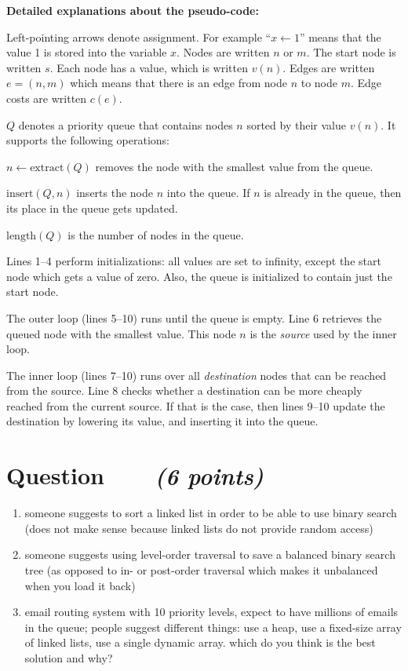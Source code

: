 \documentclass[a4paper]{article}
\newcounter{question}
\newcommand{\question}[1]{\refstepcounter{question}\section*{Question~\thequestion~~~\small\emph{(#1)}}}
\renewcommand*\thequestion{\arabic{question}}
\begin{document}
\vfill

\noindent\textbf{Detailed explanations about the pseudo-code:}

Left-pointing arrows denote assignment.
For example ``$x \leftarrow 1$'' means that the value 1 is stored into the variable $x$.
Nodes are written $n$ or $m$.
The start node is written $s$.
Each node has a value, which is written $v(n)$.
Edges are written $e=(n,m)$ which means that there is an edge from node $n$ to node $m$.
Edge costs are written $c(e)$.

$Q$ denotes a priority queue that contains nodes $n$ sorted by their value $v(n)$.
It supports the following operations:
\begin{compactitem}
\item
  $n \leftarrow \text{extract}(Q)$ removes the node with the smallest value from the queue.
\item
  $\text{insert}(Q,n)$ inserts the node $n$ into the queue.
  If $n$ is already in the queue, then its place in the queue gets updated.
\item
  $\text{length}(Q)$ is the number of nodes in the queue.
\end{compactitem}

Lines 1--4 perform initializations: all values are set to infinity, except the start node which gets a value of zero.
Also, the queue is initialized to contain just the start node.

The outer loop (lines 5--10) runs until the queue is empty.
Line 6 retrieves the queued node with the smallest value.
This node $n$ is the \emph{source} used by the inner loop.

The inner loop (lines 7--10) runs over all \emph{destination} nodes that can be reached from the source.
Line 8 checks whether a destination can be more cheaply reached from the current source.
If that is the case, then lines 9--10 update the destination by lowering its value, and inserting it into the queue.



\clearpage

\question{6 points}

\begin{enumerate}
\item
  someone suggests to sort a linked list in order to be able to use binary search (does not make sense because linked lists do not provide random access)
\item
  someone suggests using level-order traversal to save a balanced binary search tree (as opposed to in- or post-order traversal which makes it unbalanced when you load it back)
\item
  email routing system with 10 priority levels, expect to have millions of emails in the queue; people suggest different things: use a heap, use a fixed-size array of linked lists, use a single dynamic array. which do you think is the best solution and why?
\end{enumerate}
\end{document}
